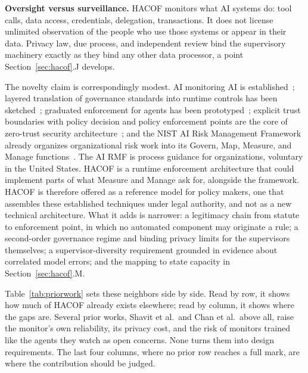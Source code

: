 \documentclass{ieeeaccess}
\newcommand{\hacof}{HACOF}
\begin{document}
\textbf{Oversight versus surveillance.} \hacof{} monitors what AI systems do: tool calls, data access, credentials, delegation, transactions. It does not license unlimited observation of the people who use those systems or appear in their data. Privacy law, due process, and independent review bind the supervisory machinery exactly as they bind any other data processor, a point Section~\ref{sec:hacof}.J develops.

The novelty claim is correspondingly modest. AI monitoring AI is established~\cite{greenblatt2024aicontrol,shavit2023agentic,gosmar2025sentinel};
layered translation of governance standards into runtime controls has been sketched~\cite{koch2026layered};
graduated enforcement for agents has been prototyped~\cite{gaurav2025gaas,wang2025mi9};
explicit trust boundaries with policy decision and policy enforcement points are the core of zero-trust security architecture~\cite{nist2020zerotrust};
and the NIST AI Risk Management Framework already organizes organizational risk work into its Govern, Map, Measure, and Manage functions~\cite{nist2023airmf}.
The AI RMF is process guidance for organizations, voluntary in the United States. \hacof{} is a runtime enforcement architecture that could implement parts of what Measure and Manage ask for, alongside the framework. \hacof{} is therefore offered as a reference model for policy makers, one that assembles these established techniques under legal authority, and not as a new technical architecture. What it adds is narrower: a legitimacy chain from statute to enforcement point, in which no automated component may originate a rule; a second-order governance regime and binding privacy limits for the supervisors themselves; a supervisor-diversity requirement grounded in evidence about correlated model errors; and the mapping to state capacity in Section~\ref{sec:hacof}.M.

Table~\ref{tab:priorwork} sets these neighbors side by side. Read by row, it shows how much of \hacof{} already exists elsewhere; read by column, it shows where the gaps are. Several prior works, Shavit et al.\ and Chan et al.\ above all, raise the monitor's own reliability, its privacy cost, and the risk of monitors trained like the agents they watch as open concerns. None turns them into design requirements. The last four columns, where no prior row reaches a full mark, are where the contribution should be judged.
\end{document}
